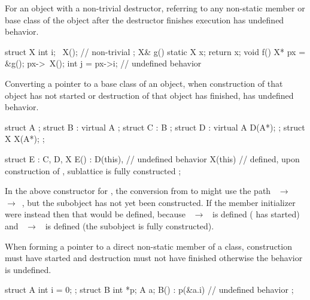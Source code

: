 \pnum
For an object with a non-trivial destructor,
referring to any non-static member or base class of the object
after the destructor finishes execution
has undefined behavior.

\pnum
\begin{example}
\begin{codeblock}
struct X {
  int i;
  ~X();     // non-trivial
};
X& g()
{
  static X x;
  return x;
}
void f()
{
  X* px = &g();
  px->~X();
  int j = px->i;    // undefined behavior
}
\end{codeblock}
\end{example}


\pnum
Converting a pointer to a base class of an object,
when construction of that object has not started
or destruction of that object has finished,
has undefined behavior.

\pnum
\begin{example}
\begin{codeblock}
struct A { };
struct B : virtual A { };
struct C : B { };
struct D : virtual A { D(A*); };
struct X { X(A*); };

struct E : C, D, X {
  E() : D(this),    // undefined behavior
        X(this) {}  // defined, upon construction of ,  sublattice is fully constructed
};
\end{codeblock}
In the above constructor for ,
the conversion from  to 
might use the path
~$\rightarrow$~~$\rightarrow$~,
but the  subobject has
not yet been constructed.
If the member initializer were instead
then that would be defined,
because ~$\rightarrow$~ is defined
( has started) and
~$\rightarrow$~ is defined
(the  subobject is fully constructed).
\end{example}


\pnum
When forming a pointer to
a direct non-static member of a class,
construction must have started
and destruction must not have finished
otherwise the behavior is undefined.

\pnum
\begin{example}
\begin{codeblock}
struct A {
  int i = 0;
};
struct B {
  int *p;
  A a;
  B() : p(&a.i) {}  // undefined behavior
};
\end{codeblock}
\end{example}

